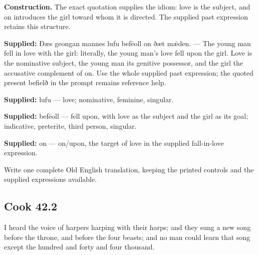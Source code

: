 \textbf{Construction.} The exact quotation supplies the idiom: love is the subject, and on introduces the girl toward whom it is directed. The supplied past expression retains this structure.

\textbf{Supplied:} Ðæs geongan mannes lufu befēoll on ðæt mǣden. — The young man fell in love with the girl: literally, the young man’s love fell upon the girl. Love is the nominative subject, the young man its genitive possessor, and the girl the accusative complement of on. Use the whole supplied past expression; the quoted present befielð in the prompt remains reference help.

\textbf{Supplied:} lufu — love; nominative, feminine, singular.

\textbf{Supplied:} befēoll — fell upon, with love as the subject and the girl as its goal; indicative, preterite, third person, singular.

\textbf{Supplied:} on — on/\allowbreak{}upon, the target of love in the supplied fall-in-love expression.

Write one complete Old English translation, keeping the printed controls and the supplied expressions available.

\par\begin{minipage}{\linewidth}\raggedright
\subsection*{Cook 42.2}

I heard the voice of harpers harping with their harps; and they sung a new song before the throne, and before the four beasts; and no man could learn that song except the hundred and forty and four thousand.

\end{minipage}\par\addvspace{4pt}

